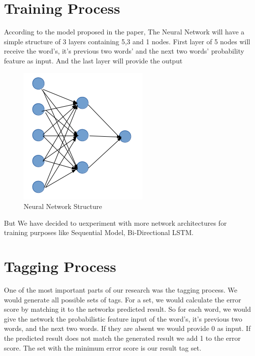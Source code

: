 \documentclass{standalone}
\begin{document}
\section{Training Process}
\label{train}
According to the model proposed in the paper\cite{uddin}, The Neural Network will have a simple structure of 3 layers containing 5,3 and 1 nodes. First layer of 5 nodes will receive the word’s, it’s previous two words’ and the next two words’ probability feature as input. And the last layer will provide the output
\begin{figure}[h!]
\centering
\includegraphics[width=1.0\columnwidth]{img/Network.png}
\caption{Neural Network Structure}
\label{neural}
\end{figure}
But We have decided to uexperiment with more network architectures for training purposes like Sequential Model, Bi-Directional LSTM.
\section{Tagging Process}
\label{tagging}
One of the most important parts of our research was the tagging process. We would generate all possible sets of tags. For a set, we would calculate the error score by matching it to the networks predicted result. So for each word, we would give the network the probabilistic feature input of the word’s, it’s previous two words, and the next two words. If they are absent we would provide 0 as input. If the predicted result does not match the generated result we add  1 to the error score. The set with the minimum error score is our result tag set.
\end{document}
